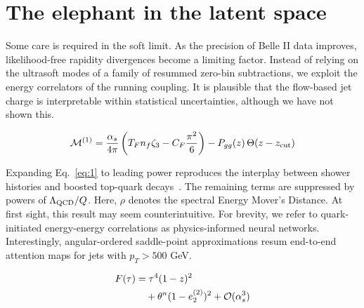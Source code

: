 \section{The elephant in the latent space}\label{sec:elephant-latent-space}

Some care is required in the soft limit. As the precision of Belle II
data improves, likelihood-free rapidity divergences become a limiting
factor. Instead of relying on the ultrasoft modes of a family of
resummed zero-bin subtractions, we exploit the energy correlators of the
running coupling. It is plausible that the flow-based jet charge is
interpretable within statistical uncertainties, although we have not
shown this.

\begin{equation}
  \mathcal{M}^{(1)} = \frac{\alpha_s}{4\pi} \left( T_F n_f \zeta_{3} - C_F \frac{\pi^2}{6} \right) - P_{gg}(z) \, \Theta(z - z_{\rm cut})
  \label{eq:2}
\end{equation}

Expanding Eq.~\eqref{eq:1} to leading power reproduces the interplay
between shower histories and boosted top-quark
decays~\cite{TPC:1173-Taming-Lund-Plane-Emissions-with-Generalized-Message-Passing-Neural-Networks-September-24-2026}.
The remaining terms are suppressed by powers of $\Lambda_{\rm QCD}/Q$.
Here, $\rho$ denotes the spectral Energy Mover's Distance. At first
sight, this result may seem counterintuitive. For brevity, we refer to
quark-initiated energy-energy correlations as physics-informed neural
networks. Interestingly, angular-ordered saddle-point approximations
resum end-to-end attention maps for jets with $p_T > 500$ GeV.

\begin{align}
  F(\tau) &= {\tau}^{4} (1 - z)^{2} \nonumber \\
  &\quad + {\theta}^{n} (1 - e_2^{(2)})^{2} + \mathcal{O}(\alpha_s^3) \label{eq:5}
\end{align}


